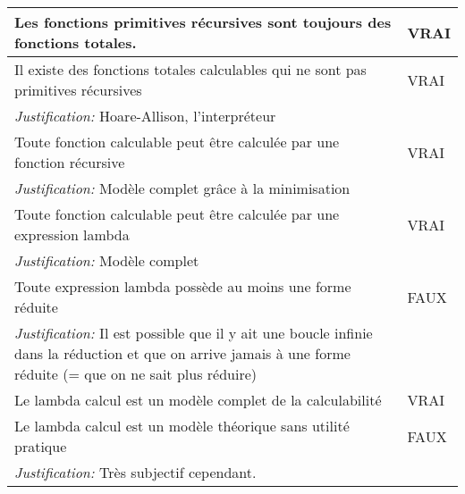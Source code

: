 \begin{longtable}{p{13cm}|l}
    Les fonctions primitives récursives sont toujours des fonctions totales.& VRAI \\
    \hline
    Il existe des fonctions totales calculables qui ne sont pas primitives récursives & VRAI \\
    \textit{Justification:} Hoare-Allison, l'interpréteur & \\
    \hline
    Toute fonction calculable peut être calculée par une fonction récursive& VRAI \\
    \textit{Justification:} Modèle complet grâce à la minimisation & \\
    \hline
    Toute fonction calculable peut être calculée par une expression lambda& VRAI\\
    \textit{Justification:} Modèle complet & \\
    \hline
    Toute expression lambda possède au moins une forme réduite & FAUX \\
    \textit{Justification:} Il est possible que il y ait une boucle infinie dans la réduction et que on arrive jamais à une forme réduite (= que on ne sait plus réduire)& \\
    \hline
    Le lambda calcul est un modèle complet de la calculabilité & VRAI \\
    \hline
    Le lambda calcul est un modèle théorique sans utilité pratique & FAUX \\
    \textit{Justification:} Très subjectif cependant.& \\

\end{longtable}

